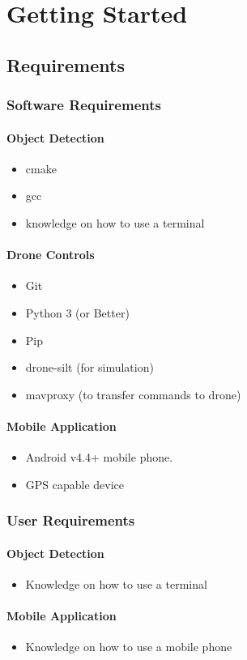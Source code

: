 \chapter{Getting Started}

\section{Requirements}
\subsection{Software Requirements}

\subsubsection{Object Detection \cite{darknet}}
\begin{itemize}
    \item cmake
    \item gcc
    \item knowledge on how to use a terminal
\end{itemize}

\subsubsection{Drone Controls}
\begin{itemize}
    \item Git
    \item Python 3 (or Better)
    \item Pip
    \item drone-silt (for simulation) \cite{dronekit}
    \item mavproxy (to transfer commands to drone) \cite{mavproxy}
\end{itemize}

\subsubsection{Mobile Application} 
\begin{itemize}
		\item Android v4.4+ mobile phone.
		\item GPS capable device
\end{itemize}

\subsection{User Requirements}
\subsubsection{Object Detection}
\begin{itemize}
    \item Knowledge on how to use a terminal
\end{itemize}
\subsubsection{Mobile Application}
\begin{itemize}
    \item Knowledge on how to use a mobile phone
\end{itemize}
